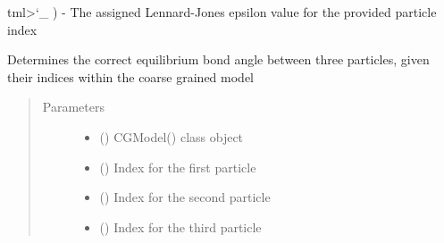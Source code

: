 \documentclass[letterpaper,12pt,english,openany,oneside]{sphinxmanual}
\begin{document}
\begin{fulllineitems}
\begin{fulllineitems}
\begin{quote}
\begin{quote}
\begin{description}
\begin{itemize}
\end{itemize}

\end{description}\end{quote}
\end{quote}

tml\textgreater{}{}`\_ ) - The assigned Lennard-Jones epsilon value for the provided particle index

\end{fulllineitems}


\begin{fulllineitems}
\label{\detokenize{cg_model:cg_model.cgmodel.CGModel.get_equil_bond_angle}}
Determines the correct equilibrium bond angle between three particles, given their indices within the coarse grained model
\begin{quote}\begin{description}
\item[{Parameters}] \leavevmode\begin{itemize}
\item {} 
 () \textendash{} CGModel() class object

\item {} 
 () \textendash{} Index for the first particle

\item {} 
 () \textendash{} Index for the second particle

\item {} 
 () \textendash{} Index for the third particle

\end{itemize}


\end{description}
\end{quote}
\end{fulllineitems}
\end{fulllineitems}
\end{document}
